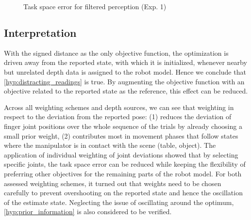 \begin{figure}
\centering
{}
\caption{Task space error for filtered perception (Exp. 1)}
\label{fig:filter_pose_error}
\end{figure}


\subsection{Interpretation}

With the signed distance as the only objective function, the optimization is driven away from the reported state, with which it is initialized, whenever nearby but unrelated depth data is assigned to the robot model. Hence we conclude that \cref{hyp:distracting_readings} is true. By augmenting the objective function with an objective related to the reported state as the reference, this effect can be reduced.

Across all weighting schemes and depth sources, we can see that weighting in respect to the deviation from the reported pose: (1) reduces the deviation of finger joint positions over the whole sequence of the trials by already choosing a small prior weight, (2) contributes most in movement phases that follow states where the manipulator is in contact with the scene (table, object). The application of individual weighting of joint deviations showed that by selecting specific joints, the task space error can be reduced while keeping the flexibility of preferring other objectives for the remaining parts of the robot model. For both assessed weighting schemes, it turned out that weights need to be chosen carefully to prevent overshooting on the reported state and hence the oscillation of the estimate state. Neglecting the issue of oscillating around the optimum, \cref{hyp:prior_information} is also considered to be verified.


